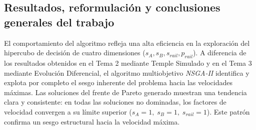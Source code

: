 \subsection*{Resultados, reformulación y conclusiones generales del trabajo}
El comportamiento del algoritmo refleja una alta eficiencia en la exploración del hipercubo de decisión de cuatro dimensiones 
($s_A, s_B, s_{rail}, p_{rail}$). A diferencia de los resultados obtenidos en el Tema 2 mediante Temple Simulado y en el Tema 3
mediante Evolución Diferencial, el algoritmo multiobjetivo \textit{NSGA-II} identifica y explota por completo el sesgo inherente 
del problema hacia las velocidades máximas. Las soluciones del frente de Pareto generado muestran una tendencia clara y 
consistente: en todas las soluciones no dominadas, los factores de velocidad convergen a su límite superior 
($s_A = 1,\; s_B = 1,\; s_{rail} = 1$). Este patrón confirma un sesgo estructural hacia la velocidad 
máxima. \\

